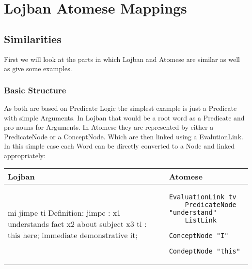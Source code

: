 
\chapter{Lojban Atomese Mappings} %

\label{Chapter1} %


\newcommand{\keyword}[1]{\textbf{#1}}
\newcommand{\tabhead}[1]{\textbf{#1}}
\newcommand{\code}[1]{\texttt{#1}}
\newcommand{\file}[1]{\texttt{\bfseries#1}}
\newcommand{\option}[1]{\texttt{\itshape#1}}


\section{Similarities}

First we will look at the parts in which Lojban and Atomese are similar as well as give some examples.

\subsection{Basic Structure}

As both are based on Predicate Logic the simplest example is just a Predicate with simple Arguments. In Lojban that would be a root word as a Predicate and pro-nouns for Arguments. In Atomese they are represented by either a PredicateNode or a ConceptNode. Which are then linked using a EvalutionLink.
In this simple case each Word can be directly converted to a Node and linked appropriately:

\begin{center}
    \begin{tabular}{| p{7cm} | p{7cm} |}
        \hline
        Lojban & Atomese \\
        \hline
        \begin{center}
mi jimpe ti \newline
Definition: \newline
jimpe : x1 understands fact x2 about subject x3 \newline
ti : this here; immediate demonstrative it;
        \end{center}
        &
        \begin{lstlisting}
EvaluationLink tv
    PredicateNode "understand"
    ListLink
        ConceptNode "I"
        CondeptNode "this"
        \end{lstlisting} \\
        \hline
    \end{tabular}
\end{center}

